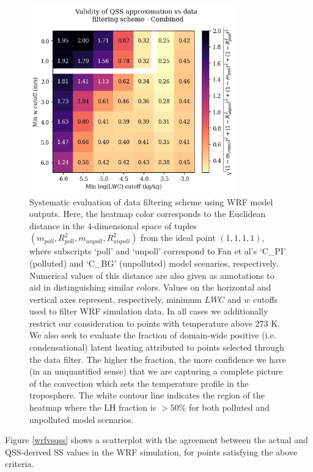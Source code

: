 \documentclass{article}
\begin{document}
\begin{figure}[ht]
    \centering
    \includegraphics[width=9cm]{revmywrf/v1_FINAL_from_data_combo_heatmap_figure.png}
    \caption{Systematic evaluation of data filtering scheme using WRF model outputs. Here, the heatmap color corresponds to the Euclidean distance in the 4-dimensional space of tuples $(m_{poll}, R^2_{poll}, m_{unpoll}, R^2_{unpoll})$ from the ideal point $(1, 1, 1, 1)$, where subscripts `poll' and `unpoll' correspond to Fan et al's `C\_PI' (polluted) and `C\_BG' (unpolluted) model scenarios, respectively. Numerical values of this distance are also given as annotations to aid in distinguishing similar colors. Values on the horizontal and vertical axes represent, respectively, minimum $LWC$ and $w$ cutoffs used to filter WRF simulation data. In all cases we additionally restrict our consideration to points with temperature above 273 K. We also seek to evaluate the fraction of domain-wide positive (i.e. condensational) latent heating attributed to points selected through the data filter. The higher the fraction, the more confidence we have (in an unquantified sense) that we are capturing a complete picture of the convection which sets the temperature profile in the troposphere. The white contour line indicates the region of the heatmap where the LH fraction is $> 50\%$ for both polluted and unpolluted model scenarios.}
    \label{comboheatmap}
\end{figure}

Figure \ref{wrfvsqss} shows a scatterplot with the agreement between the actual and QSS-derived SS values in the WRF simulation, for points satisfying the above criteria.
\end{document}
